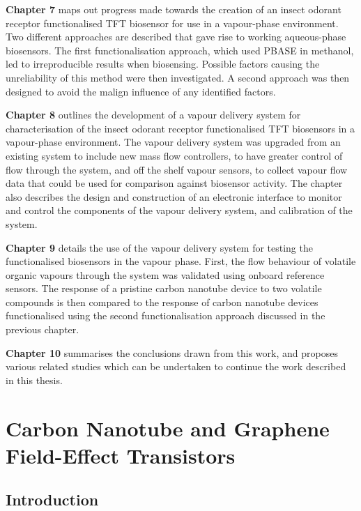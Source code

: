 \documentclass[
  a4paper,
]{scrbook}
\begin{document}
\textbf{Chapter 7} maps out progress made towards the creation of an
insect odorant receptor functionalised TFT biosensor for use in a
vapour-phase environment. Two different approaches are described that
gave rise to working aqueous-phase biosensors. The first
functionalisation approach, which used PBASE in methanol, led to
irreproducible results when biosensing. Possible factors causing the
unreliability of this method were then investigated. A second approach
was then designed to avoid the malign influence of any identified
factors.

\textbf{Chapter 8} outlines the development of a vapour delivery system
for characterisation of the insect odorant receptor functionalised TFT
biosensors in a vapour-phase environment. The vapour delivery system was
upgraded from an existing system to include new mass flow controllers,
to have greater control of flow through the system, and off the shelf
vapour sensors, to collect vapour flow data that could be used for
comparison against biosensor activity. The chapter also describes the
design and construction of an electronic interface to monitor and
control the components of the vapour delivery system, and calibration of
the system.

\textbf{Chapter 9} details the use of the vapour delivery system for
testing the functionalised biosensors in the vapour phase. First, the
flow behaviour of volatile organic vapours through the system was
validated using onboard reference sensors. The response of a pristine
carbon nanotube device to two volatile compounds is then compared to the
response of carbon nanotube devices functionalised using the second
functionalisation approach discussed in the previous chapter.

\textbf{Chapter 10} summarises the conclusions drawn from this work, and
proposes various related studies which can be undertaken to continue the
work described in this thesis.


\hypertarget{sec-thin-film-transistors}{%
\chapter{Carbon Nanotube and Graphene Field-Effect
Transistors}\label{sec-thin-film-transistors}}

\hypertarget{introduction-1}{%
\section{Introduction}\label{introduction-1}}
\end{document}
